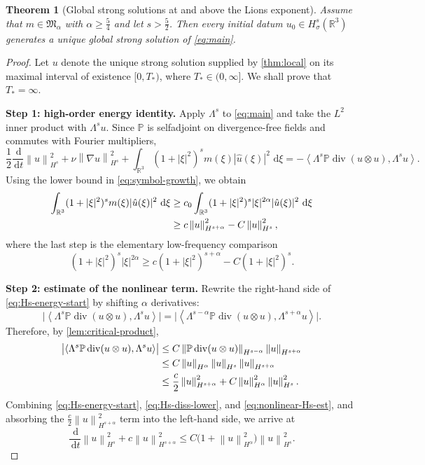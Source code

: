 \documentclass[10pt,a4paper]{amsart}
\newtheorem{theorem}{Theorem}
\newcommand{\Pcal}{\mathbb{P}}
\newcommand{\R}{\mathbb{R}}
\newcommand{\dd}{\,\mathrm{d}}
\newcommand{\diver}{\operatorname{div}}
\newcommand{\ip}[2]{\left\langle #1,#2\right\rangle}
\newcommand{\norm}[1]{\left\lVert #1\right\rVert}
\begin{document}
\begin{theorem}[Global strong solutions at and above the Lions exponent]\label{thm:lions}
Assume that $m\in\mathfrak M_\alpha$ with $\alpha\ge \frac54$ and let $s>\frac52$. Then every initial datum $u_0\in H^s_\sigma(\R^3)$ generates a unique global strong solution of \eqref{eq:main}.
\end{theorem}

\begin{proof}
Let $u$ denote the unique strong solution supplied by \cref{thm:local} on its maximal interval of existence $[0,T_*)$, where $T_*\in(0,\infty]$. We shall prove that $T_*=\infty$.

\smallskip
\noindent\textbf{Step 1: high-order energy identity.}
Apply $\Lambda^s$ to \eqref{eq:main} and take the $L^2$ inner product with $\Lambda^s u$. Since $\Pcal$ is selfadjoint on divergence-free fields and commutes with Fourier multipliers,
\begin{equation}\label{eq:Hs-energy-start}
\frac12\frac{\dd}{\dd t}\norm{u}_{H^s}^2
+\nu\norm{\nabla u}_{H^s}^2
+\int_{\R^3}(1+|\xi|^2)^s m(\xi)|\hat u(\xi)|^2\,\dd\xi
=-\ip{\Lambda^s \Pcal\diver(u\otimes u)}{\Lambda^s u}.
\end{equation}
Using the lower bound in \eqref{eq:symbol-growth}, we obtain
\begin{align}
\int_{\R^3}(1+|\xi|^2)^s m(\xi)|\hat u(\xi)|^2\,\dd\xi
&\ge c_0\int_{\R^3}(1+|\xi|^2)^s|\xi|^{2\alpha}|\hat u(\xi)|^2\,\dd\xi \notag\\
&\ge c\norm{u}_{H^{s+\alpha}}^2-C\norm{u}_{H^s}^2,
\label{eq:Hs-diss-lower}
\end{align}
where the last step is the elementary low-frequency comparison
\[
(1+|\xi|^2)^s|\xi|^{2\alpha}\ge c(1+|\xi|^2)^{s+\alpha}-C(1+|\xi|^2)^s.
\]

\smallskip
\noindent\textbf{Step 2: estimate of the nonlinear term.}
Rewrite the right-hand side of \eqref{eq:Hs-energy-start} by shifting $\alpha$ derivatives:
\[
\bigl|\ip{\Lambda^s \Pcal\diver(u\otimes u)}{\Lambda^s u}\bigr|
=
\bigl|\ip{\Lambda^{s-\alpha}\Pcal\diver(u\otimes u)}{\Lambda^{s+\alpha}u}\bigr|.
\]
Therefore, by \cref{lem:critical-product},
\begin{align}
\bigl|\ip{\Lambda^s \Pcal\diver(u\otimes u)}{\Lambda^s u}\bigr|
&\le C\norm{\Pcal\diver(u\otimes u)}_{H^{s-\alpha}}\norm{u}_{H^{s+\alpha}} \notag\\
&\le C\norm{u}_{H^\alpha}\norm{u}_{H^s}\norm{u}_{H^{s+\alpha}} \notag\\
&\le \frac{c}{2}\norm{u}_{H^{s+\alpha}}^2 + C\norm{u}_{H^\alpha}^2\norm{u}_{H^s}^2.
\label{eq:nonlinear-Hs-est}
\end{align}
Combining \eqref{eq:Hs-energy-start}, \eqref{eq:Hs-diss-lower}, and \eqref{eq:nonlinear-Hs-est}, and absorbing the $\frac c2\norm{u}_{H^{s+\alpha}}^2$ term into the left-hand side, we arrive at
\begin{equation}\label{eq:Hs-differential}
\frac{\dd}{\dd t}\norm{u}_{H^s}^2 + c\norm{u}_{H^{s+\alpha}}^2
\le C\bigl(1+\norm{u}_{H^\alpha}^2\bigr)\norm{u}_{H^s}^2.
\end{equation}


\end{proof}
\end{document}
